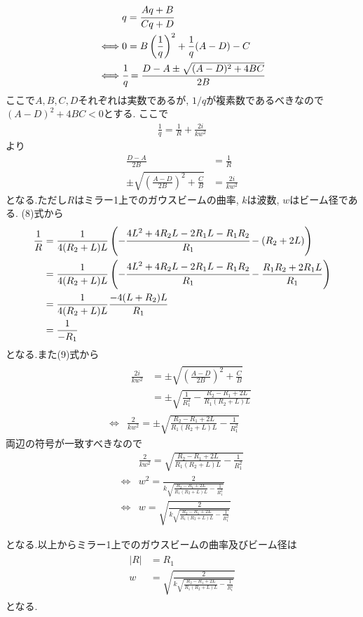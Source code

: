 \documentclass[uplatex,a4j,11pt,dvipdfmx]{jsarticle}
\begin{document}
\begin{eqnarray}
  &q=\cfrac{Aq+B}{Cq+D}\nonumber\\
  \iff&0=B\left(\frac{1}{q}\right)^2+\frac{1}{q}(A-D)-C\nonumber\\
  \iff&\cfrac{1}{q}=\frac{D-A\pm\sqrt{(A-D)^2+4BC}}{2B}
\end{eqnarray}
ここで$A,B,C,D$それぞれは実数であるが, $1/q$が複素数であるべきなので$(A-D)^2+4BC<0$とする.
ここで
\begin{align}
  \frac{1}{q}=\frac{1}{R}+\frac{2i}{kw^2}
\end{align}
より
\begin{align}
  \frac{D-A}{2B}&=\frac{1}{R}\\
  \pm\sqrt{\left(\frac{A-D}{2B}\right)^2+\frac{C}{B}}&=\frac{2i}{kw^2}
\end{align}
となる.ただし$R$はミラー1上でのガウスビームの曲率, $k$は波数, $w$はビーム径である.
(8)式から
\begin{align}
  \begin{split}
    \frac{1}{R}&=\frac{1}{4(R_2+L)L}\left(-\cfrac{4L^2+4R_2L-2R_1L-R_1R_2}{R_1}-(R_2+2L)\right)\\
    &=\frac{1}{4(R_2+L)L}\left(-\cfrac{4L^2+4R_2L-2R_1L-R_1R_2}{R_1}-\frac{R_1R_2+2R_1L}{R_1}\right)\\
    &=\frac{1}{4(R_2+L)L}\frac{-4(L+R_2)L}{R_1}\\
    &=\frac{1}{-R_1}
  \end{split}
\end{align}
となる.また(9)式から
\begin{eqnarray}
  &\begin{split}
    \frac{2i}{kw^2}&=\pm\sqrt{\left(\frac{A-D}{2B}\right)^2+\frac{C}{B}}\\
    &=\pm\sqrt{\frac{1}{R_1^2}-\frac{R_2-R_1+2L}{R_1(R_2+L)L}}
  \end{split}\nonumber\\
  \iff&\frac{2}{kw^2}=\pm\sqrt{\frac{R_2-R_1+2L}{R_1(R_2+L)L}-\frac{1}{R_1^2}}
\end{eqnarray}
両辺の符号が一致すべきなので
\begin{eqnarray}
  &\frac{2}{kw^2}=\sqrt{\frac{R_2-R_1+2L}{R_1(R_2+L)L}-\frac{1}{R_1^2}}\nonumber\\
  \iff&w^2=\frac{2}{k\sqrt{\frac{R_2-R_1+2L}{R_1(R_2+L)L}-\frac{1}{R_1^2}}}\nonumber\\
  \iff&w=\sqrt{\frac{2}{k\sqrt{\frac{R_2-R_1+2L}{R_1(R_2+L)L}-\frac{1}{R_1^2}}}}
\end{eqnarray}

となる.以上からミラー1上でのガウスビームの曲率及びビーム径は
\begin{align}
  \begin{split}
    |R|&=R_1\\
    w&=\sqrt{\frac{2}{k\sqrt{\frac{R_2-R_1+2L}{R_1(R_2+L)L}-\frac{1}{R_1^2}}}}
  \end{split}
\end{align}
となる.
\end{document}
